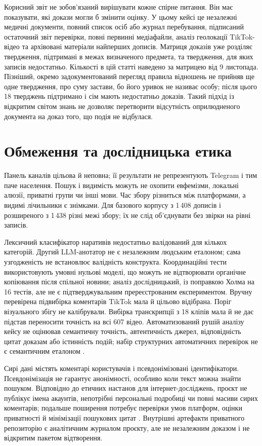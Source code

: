 Корисний звіт не зобов'язаний вирішувати кожне спірне питання. Він має показувати, які докази могли б змінити оцінку. У цьому кейсі це незалежні медичні документи, повний список осіб або журнал перебування, підписаний остаточний звіт перевірки, повні первинні медіафайли, аналіз геолокації TikTok-відео та архівовані матеріали найперших дописів. Матриця доказів уже розділяє твердження, підтримані в межах визначеного предмета, та твердження, для яких записів недостатньо. Кількості в цій статті наведено за матрицею від 9 листопада. Пізніший, окремо задокументований перегляд правила відношень не прийняв ще одне твердження, про суму застави, бо його уривок не називає особу; після цього 18 тверджень підтримано і сім мають недостатньо доказів. Такий підхід із відкритим світом знань не дозволяє перетворити відсутність оприлюдненого документа на доказ того, що подія не відбулася.

\section{Обмеження та дослідницька етика}

Панель каналів цільова й неповна; її результати не репрезентують Telegram і тим паче населення. Пошук і видимість можуть не охопити евфемізми, локальні алюзії, приватні групи чи інші мови. Час збору різниться між платформами, а видимі лічильники є знімками. Для базового корпусу з 1\,408 дописів і розширеного з 1\,438 різні межі збору; їх не слід об'єднувати без звірки на рівні записів.

Лексичний класифікатор наративів недостатньо валідований для кількох категорій. Другий LLM-анотатор не є незалежним людським еталоном; сама узгодженість не встановлює валідність конструкта. Координаційні тести використовують умовні нульові моделі, що можуть не відтворювати органічне копіювання після спільної новини; аналіз дослідницький, із поправкою Холма на 16 тестів, але не є підтверджувальним пререєстрованим експериментом. Вручну перевірена підвибірка коментарів TikTok мала й цільово відібрана. Поріг візуального збігу не калібрували. Вибірка транскрипції з 18 кліпів мала й не дає підстав переносити точність на всі 607 відео. Автоматизований рушій аналізу кейсу не оцінював семантичну точність, автентичність джерел, відповідність цитат доказам або істинність подій; набір структурних автоматичних перевірок не є семантичним еталоном \citep{socialcaseengine2026}.

Сирі дані містять коментарі користувачів і псевдонімізовані ідентифікатори. Псевдонімізація не гарантує анонімності, особливо коли текст можна знайти пошуком. Відповідно до етичних настанов для інтернет-досліджень, проєкт не публікує імена акаунтів, непотрібні персональні подробиці чи повні масиви сирих коментарів; подальше поширення потребує перевірки умов платформ, оцінки приватності й мінімізації пошукових цитат \citep{aoir2019ethics}. Внутрішні артефакти приватного репозиторію є аналітичним журналом проєкту, але не незалежним доказом і не відкритим пакетом відтворення.

